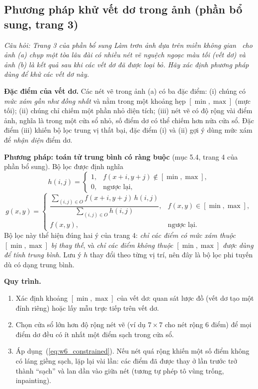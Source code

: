 \subsection{Phương pháp khử vết dơ trong ảnh (phần bổ sung, trang 3)}
\label{subsec:w6_dirt_method}

\textit{Câu hỏi: Trang 3 của phần bổ sung \emph{Làm trơn ảnh dựa trên miền không gian}~\citep{xlav_lec5b} cho ảnh (a) chụp một tòa lâu đài có nhiều nét vẽ nguệch ngoạc màu tối (vết dơ) và ảnh (b) là kết quả sau khi các vết dơ đã được loại bỏ. Hãy xác định phương pháp dùng để khử các vết dơ này.}

\textbf{Đặc điểm của vết dơ.} Các nét vẽ trong ảnh (a) có ba đặc điểm: (i) chúng có \emph{mức xám gần như đồng nhất} và nằm trong một khoảng hẹp $[\min, \max]$ (mực tối); (ii) chúng chỉ chiếm một phần nhỏ diện tích; (iii) nét vẽ có độ rộng vài điểm ảnh, nghĩa là trong một cửa sổ nhỏ, số điểm dơ có thể chiếm hơn nửa cửa sổ. Đặc điểm (iii) khiến bộ lọc trung vị thất bại, đặc điểm (i) và (ii) gợi ý dùng mức xám để \emph{nhận diện} điểm dơ.

\textbf{Phương pháp: toán tử trung bình có ràng buộc} (mục 5.4, trang 4 của phần bổ sung). Bộ lọc được định nghĩa
\begin{equation}
h(i, j) = \begin{cases} 1, & f(x + i, y + j) \notin [\min, \max], \\ 0, & \text{ngược lại}, \end{cases}
\end{equation}
\begin{equation}
g(x, y) = \begin{cases} \dfrac{\sum_{(i, j) \in O} f(x + i, y + j)\,h(i, j)}{\sum_{(i, j) \in O} h(i, j)}, & f(x, y) \in [\min, \max], \\[2ex] f(x, y), & \text{ngược lại}. \end{cases}
\label{eq:w6_constrained}
\end{equation}
Bộ lọc này thể hiện đúng hai ý của trang 4: \emph{chỉ các điểm có mức xám thuộc $[\min, \max]$ bị thay thế}, và \emph{chỉ các điểm không thuộc $[\min, \max]$ được dùng để tính trung bình}. Lưu ý $h$ thay đổi theo từng vị trí, nên đây là bộ lọc phi tuyến dù có dạng trung bình.

\textbf{Quy trình.}
\begin{enumerate}
    \item Xác định khoảng $[\min, \max]$ của vết dơ: quan sát lược đồ (vết dơ tạo một đỉnh riêng) hoặc lấy mẫu trực tiếp trên vết dơ.
    \item Chọn cửa sổ lớn hơn độ rộng nét vẽ (ví dụ $7 \times 7$ cho nét rộng $6$ điểm) để mọi điểm dơ đều có ít nhất một điểm sạch trong cửa sổ.
    \item Áp dụng~(\ref{eq:w6_constrained}). Nếu nét quá rộng khiến một số điểm không có láng giềng sạch, lặp lại vài lần: các điểm đã được thay ở lần trước trở thành ``sạch'' và lan dần vào giữa nét (tương tự phép tô vùng trống, inpainting).
\end{enumerate}

